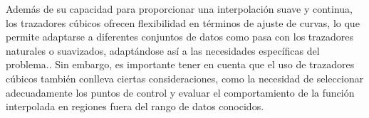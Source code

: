 \documentclass[conference]{IEEEtran}
\begin{document}
Además de su capacidad para proporcionar una interpolación suave y continua, los trazadores cúbicos ofrecen flexibilidad en términos de ajuste de curvas, lo que permite adaptarse a diferentes conjuntos de datos como pasa con los trazadores naturales o suavizados, adaptándose así a las necesidades
específicas del problema.. Sin embargo, es importante tener en cuenta que el uso de trazadores cúbicos también conlleva ciertas consideraciones, como la necesidad de seleccionar adecuadamente los puntos de control y evaluar el comportamiento de la función interpolada en regiones fuera del rango de datos conocidos.



\nocite{chapra}
\nocite{analisisnumerico}
\nocite{metodosnumericos}
\nocite{slideshare-trazadores}
\nocite{cubic-spline-book}


\end{document}
